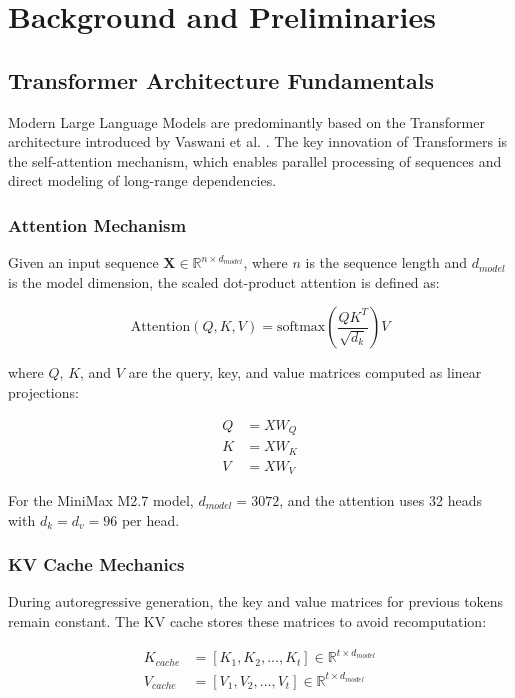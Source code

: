 \section{Background and Preliminaries}
\label{sec:background}

\subsection{Transformer Architecture Fundamentals}

Modern Large Language Models are predominantly based on the Transformer architecture introduced by Vaswani et al. \cite{vaswani2017attention}. The key innovation of Transformers is the self-attention mechanism, which enables parallel processing of sequences and direct modeling of long-range dependencies.

\subsubsection{Attention Mechanism}

Given an input sequence $\mathbf{X} \in \mathbb{R}^{n \times d_{model}}$, where $n$ is the sequence length and $d_{model}$ is the model dimension, the scaled dot-product attention is defined as:

\begin{equation}
\text{Attention}(Q, K, V) = \text{softmax}\left(\frac{QK^T}{\sqrt{d_k}}\right)V
\end{equation}

where $Q$, $K$, and $V$ are the query, key, and value matrices computed as linear projections:

\begin{align}
Q &= XW_Q \\
K &= XW_K \\
V &= XW_V
\end{align}

For the MiniMax M2.7 model, $d_{model} = 3072$, and the attention uses 32 heads with $d_k = d_v = 96$ per head.

\subsubsection{KV Cache Mechanics}

During autoregressive generation, the key and value matrices for previous tokens remain constant. The KV cache stores these matrices to avoid recomputation:

\begin{align}
K_{cache} &= [K_1, K_2, ..., K_t] \in \mathbb{R}^{t \times d_{model}} \\
V_{cache} &= [V_1, V_2, ..., V_t] \in \mathbb{R}^{t \times d_{model}}
\end{align}

